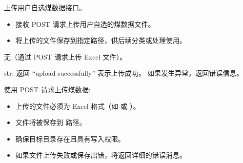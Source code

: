 \documentclass[a4paper,12pt,english]{sphinxmanual}
\begin{document}
\begin{fulllineitems}
\label{\detokenize{api/login:login.uploadUserCoalData}}
\pysigstartsignatures
{}
\pysigstopsignatures
\sphinxAtStartPar
上传用户自选煤数据接口。
\begin{description}
\begin{itemize}
\item {} 
\sphinxAtStartPar
接收 POST 请求上传用户自选的煤数据文件。

\item {} 
\sphinxAtStartPar
将上传的文件保存到指定路径，供后续分类或处理使用。

\end{itemize}

\sphinxAtStartPar
无（通过 POST 请求上传 Excel 文件）。

\sphinxAtStartPar
str: 返回 “upload successfully” 表示上传成功。
如果发生异常，返回错误信息。

\sphinxAtStartPar
使用 POST 请求上传煤数据:

\begin{sphinxVerbatim}[commandchars=\\\{\}]
 
 

\end{sphinxVerbatim}

\begin{itemize}
\item {} 
\sphinxAtStartPar
上传的文件必须为 Excel 格式（如  或 ）。

\item {} 
\sphinxAtStartPar
文件将被保存到  路径。

\item {} 
\sphinxAtStartPar
确保目标目录存在且具有写入权限。

\end{itemize}

\begin{itemize}
\item {} 
\sphinxAtStartPar
如果文件上传失败或保存出错，将返回详细的错误消息。

\end{itemize}

\end{description}

\end{fulllineitems}
\end{document}
